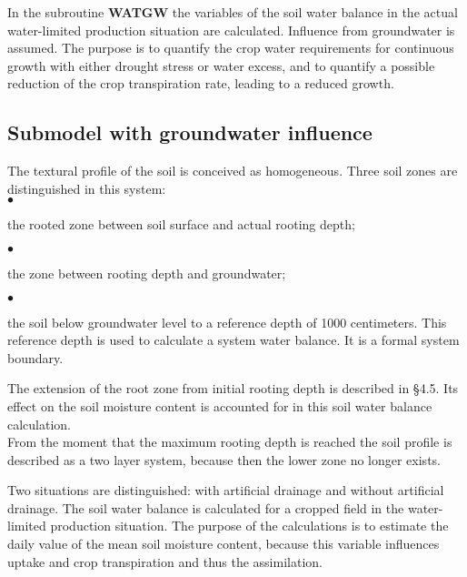 In the subroutine {\bf WATGW} the variables of the soil water balance in the actual water-limited produc\-tion situation are calculated. Influence from groundwater is assumed. The
purpose is to quantify the crop water requirements for continuous growth with either
drought stress or water excess, and to quantify a possible reduction of the crop transpira\-tion rate, leading to a reduced growth.




\subsection{Submodel with groundwater influence  }

The textural profile of the soil is conceived as homogeneous. Three soil zones are
distinguished in this system:\\
$\bullet$
\testlastline

\begin{indenting}{1.27cm}
the rooted zone between soil surface and actual rooting depth;
\end{indenting}
$\bullet$
\testlastline

\begin{indenting}{1.27cm}
the zone between rooting depth and groundwater;
\end{indenting}
$\bullet$
\testlastline

\begin{indenting}{1.27cm}
the soil below groundwater level to a reference depth of 1000 centimeters. This
reference depth is used to calculate a system water balance. It is a formal system
boundary.
\end{indenting}
 
 
The extension of the root zone from initial rooting depth is described in \S 4.5. Its effect
on the soil moisture content is accounted for in this soil water balance calculation.\\
From the moment that the maximum rooting depth is reached the soil profile is described
as a two layer system, because then the lower zone no longer exists.

Two situations are distinguished: with artificial drainage and without artificial drainage.
The soil water balance is calculated for a cropped field in the water-limited production
situation. The purpose of the calculations is to estimate the daily value of the mean soil
moisture content, because this variable influences uptake and crop transpiration and thus
the assimilation.

